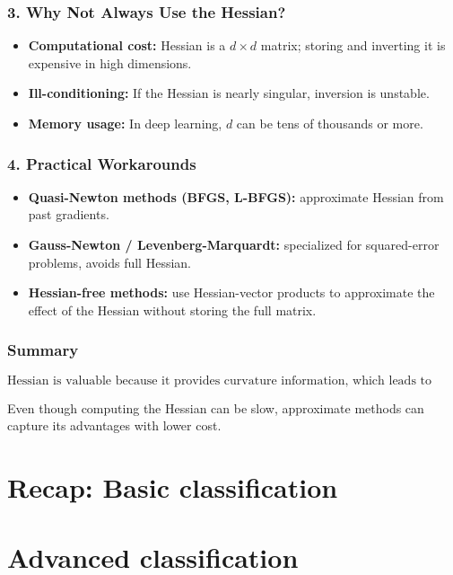 \subsubsection*{3. Why Not Always Use the Hessian?}

\begin{itemize}
    \item \textbf{Computational cost:} Hessian is a \(d \times d\) matrix; storing and inverting it is expensive in high dimensions.
    \item \textbf{Ill-conditioning:} If the Hessian is nearly singular, inversion is unstable.
    \item \textbf{Memory usage:} In deep learning, \(d\) can be tens of thousands or more.
\end{itemize}

\subsubsection*{4. Practical Workarounds}

\begin{itemize}
    \item \textbf{Quasi-Newton methods (BFGS, L-BFGS):} approximate Hessian from past gradients.
    \item \textbf{Gauss-Newton / Levenberg-Marquardt:} specialized for squared-error problems, avoids full Hessian.
    \item \textbf{Hessian-free methods:} use Hessian-vector products to approximate the effect of the Hessian without storing the full matrix.
\end{itemize}

\subsubsection*{Summary}

\[
\text{Hessian is valuable because it provides curvature information, which leads to faster and more stable convergence.}
\]

Even though computing the Hessian can be slow, approximate methods can capture its advantages with lower cost.

\section{Recap: Basic classification}
\section{Advanced classification}
